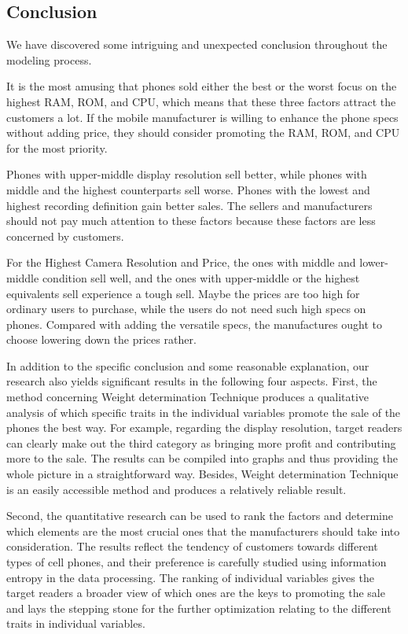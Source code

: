 \subsection{Conclusion}

We have discovered some intriguing and unexpected conclusion throughout the modeling process. 

It is the most amusing that phones sold either the best or the worst focus on the highest RAM, ROM, and CPU, which means that these three factors attract the customers a lot. If the mobile manufacturer is willing to enhance the phone specs without adding price, they should consider promoting the RAM, ROM, and CPU for the most priority. 

Phones with upper-middle display resolution sell better, while phones with middle and the highest counterparts sell worse. Phones with the lowest and highest recording definition gain better sales. The sellers and manufacturers should not pay much attention to these factors because these factors are less concerned by customers. 


For the Highest Camera Resolution and Price, the ones with middle and lower-middle condition sell well, and the ones with upper-middle or the highest equivalents sell experience a tough sell. Maybe the prices are too high for ordinary users to purchase, while the users do not need such high specs on phones. Compared with adding the versatile specs, the manufactures ought to choose lowering down the prices rather. 

In addition to the specific conclusion and some reasonable explanation, our research also yields significant results in the following four aspects. First, the method concerning Weight determination Technique produces a qualitative analysis of which specific traits in the individual variables promote the sale of the phones the best way. For example, regarding the display resolution, target readers can clearly make out the third category as bringing more profit and contributing more to the sale. The results can be compiled into graphs and thus providing the whole picture in a straightforward way. Besides, Weight determination Technique is an easily accessible method and produces a relatively reliable result.

Second, the quantitative research can be used to rank the factors and determine which elements are the most crucial ones that the manufacturers should take into consideration. The results reflect the tendency of customers towards different types of cell phones, and their preference is carefully studied using information entropy in the data processing. The ranking of individual variables gives the target readers a broader view of which ones are the keys to promoting the sale and lays the stepping stone for the further optimization relating to the different traits in individual variables.

